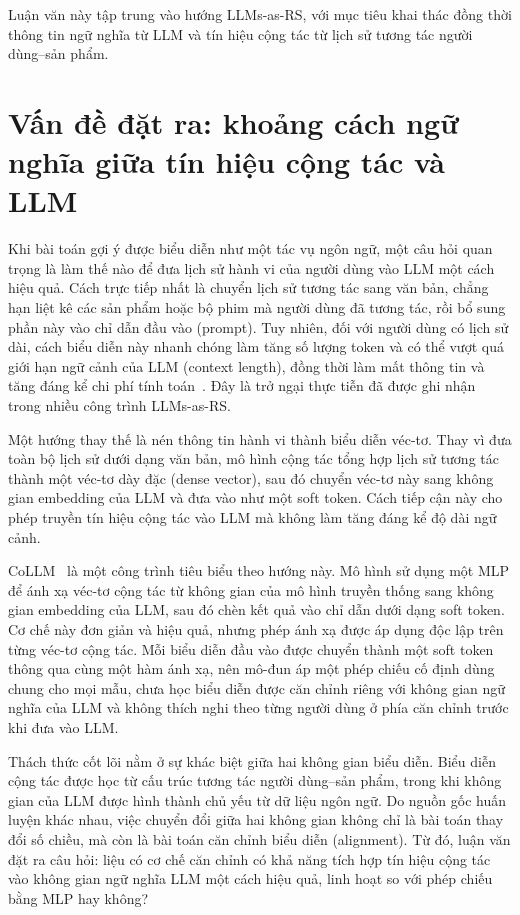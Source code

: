 Luận văn này tập trung vào hướng LLMs-as-RS, với mục tiêu khai thác đồng thời thông tin
ngữ nghĩa từ LLM và tín hiệu cộng tác từ lịch sử tương tác người dùng--sản phẩm.

\section{Vấn đề đặt ra: khoảng cách ngữ nghĩa giữa tín hiệu cộng tác và LLM}
\label{sec:van-de}

Khi bài toán gợi ý được biểu diễn như một tác vụ ngôn ngữ, một câu hỏi quan trọng là làm
thế nào để đưa lịch sử hành vi của người dùng vào LLM một cách hiệu quả. Cách trực tiếp
nhất là chuyển lịch sử tương tác sang văn bản, chẳng hạn liệt kê các sản phẩm hoặc bộ phim
mà người dùng đã tương tác, rồi bổ sung phần này vào chỉ dẫn đầu vào (prompt). Tuy nhiên, đối với
người dùng có lịch sử dài, cách biểu diễn này nhanh chóng làm tăng số lượng token và có thể
vượt quá giới hạn ngữ cảnh của LLM (context length), đồng thời làm mất thông tin và
tăng đáng kể chi phí tính toán~\cite{collm2023}. Đây là trở ngại thực tiễn đã được ghi nhận trong nhiều công trình
LLMs-as-RS.

Một hướng thay thế là nén thông tin hành vi thành biểu diễn véc-tơ. Thay vì đưa toàn bộ lịch
sử dưới dạng văn bản, mô hình cộng tác tổng hợp lịch sử tương tác thành một véc-tơ dày đặc (dense vector),
sau đó chuyển véc-tơ này sang không gian embedding của LLM và đưa vào như một soft token.
Cách tiếp cận này cho phép truyền tín hiệu cộng tác vào LLM mà không làm tăng đáng kể độ
dài ngữ cảnh.

CoLLM~\cite{collm2023} là một công trình tiêu biểu theo hướng này. Mô hình sử dụng một
MLP để ánh xạ véc-tơ cộng tác từ không gian của mô hình truyền thống sang không gian
embedding của LLM, sau đó chèn kết quả vào chỉ dẫn dưới dạng soft token. Cơ chế này đơn
giản và hiệu quả, nhưng phép ánh xạ được áp dụng độc lập trên từng véc-tơ cộng tác. Mỗi
biểu diễn đầu vào được chuyển thành một soft token thông qua cùng một hàm ánh xạ, nên
mô-đun áp một phép chiếu cố định dùng chung cho mọi mẫu, chưa học biểu diễn được
căn chỉnh riêng với không gian ngữ nghĩa của LLM và không thích nghi theo từng người dùng ở
phía căn chỉnh trước khi đưa vào LLM.

Thách thức cốt lõi nằm ở sự khác biệt giữa hai không gian biểu diễn. Biểu diễn cộng tác được
học từ cấu trúc tương tác người dùng--sản phẩm, trong khi không gian của LLM được hình
thành chủ yếu từ dữ liệu ngôn ngữ. Do nguồn gốc huấn luyện khác nhau, việc chuyển đổi giữa
hai không gian không chỉ là bài toán thay đổi số chiều, mà còn là bài toán căn chỉnh biểu
diễn (alignment). Từ đó, luận văn đặt ra câu hỏi: liệu có cơ chế căn chỉnh có khả năng tích hợp
tín hiệu cộng tác vào không gian ngữ nghĩa LLM một cách hiệu quả, linh hoạt so với phép chiếu
bằng MLP hay không?

